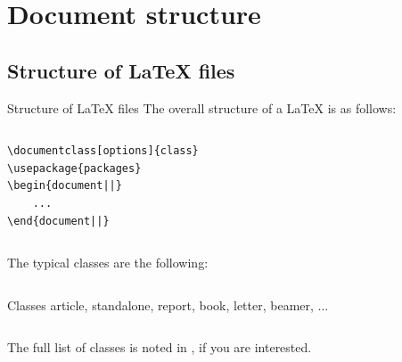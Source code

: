 \documentclass[10pt,xcolor={dvipsnames}, aspectratio=169]{beamer}
\begin{document}
\section{Document structure}
\begin{frame}
\end{frame}
\subsection{Structure of \LaTeX \xspace files}
    \begin{frame}[fragile]{Structure of \LaTeX \xspace files}
    The overall structure of a \LaTeX \xspace is as follows:
    \smallskip
    \begin{columns}
        \begin{column}{0.9 \textwidth}
        \begin{verbatim}
\documentclass[options]{class}
\usepackage{packages}
\begin{document||}
    ...
\end{document||}
    \end{verbatim}
		\end{column}
    \end{columns}
    \smallskip
    The typical classes are the following:
    \begin{center}
    \begin{columns}
        \begin{column}{0.52 \textwidth}
        \begin{block}{Classes}
			article, standalone, report, book, letter, beamer, ...
		\end{block}
		\end{column}
    \end{columns}
    \end{center}
    The full list of classes is noted in \href{https://ctan.org/topic/class}{}, if you are interested.
\end{frame}
\end{document}
